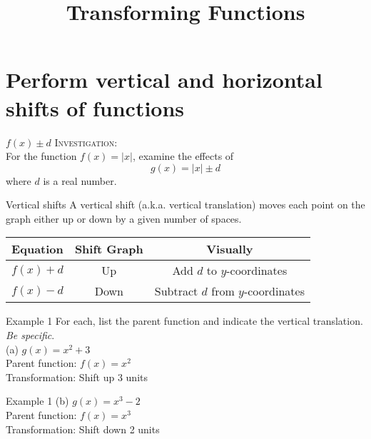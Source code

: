 \documentclass[t]{beamer}
\title{Transforming Functions}
\author{}
\date{}
\begin{document}
\section{Perform vertical and horizontal shifts of functions}

\begin{frame}{$f(x) \pm d$}
\textsc{Investigation:}	\newline\\

For the function $f(x) = |x|$, examine the effects of
\[g(x) = |x| \pm d \]
where $d$ is a real number.
\end{frame}

\begin{frame}{Vertical shifts}
A \alert{vertical shift} (a.k.a. \alert{vertical translation}) moves each point on the graph either up or down by a given number of spaces.	\newline\\	\pause
\begin{center}

\setlength{\extrarowheight}{6pt}
\begin{tabular}{c|c|c}
\textbf{Equation}	&	\textbf{Shift Graph} & \textbf{Visually} \\ \hline
$f(x) + d$	& Up	& Add $d$ to $y$-coordinates	\\[6pt]	\hline
$f(x) - d$ & Down & Subtract $d$ from $y$-coordinates \\
\end{tabular}
\end{center}
\end{frame}

\begin{frame}{Example 1}
For each, list the parent function and indicate the vertical translation. \emph{Be specific}.	\newline\\	
(a) \quad $g(x) = x^2 + 3$	\newline\\	\pause
Parent function: $f(x) = x^2$	\newline\\	\pause
Transformation: Shift up 3 units
\end{frame}

\begin{frame}{Example 1}
(b) \quad $g(x) = x^3 - 2$	\newline\\	\pause
Parent function: $f(x) = x^3$	\newline\\	\pause
Transformation: Shift down 2 units
\end{frame}
\end{document}
